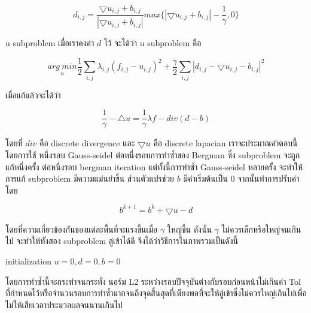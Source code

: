 \documentclass[hidelinks,a4paper,14pt]{article}
\numberwithin{equation}{section}							%
\begin{document}
{		$$ d_{i,j} = \frac{\bigtriangledown u_{i,j}  + b_{i,j} }{ | \bigtriangledown u_{i,j}  + b_{i,j} | } max \{  | \bigtriangledown u_{i,j}  + b_{i,j} | - \frac{1}{\gamma} , 0\} $$
		
		u subproblem เมื่อเราคงค่า $d$ ไว้ จะได้ว่า u subproblem คือ
		
		$$ \underset{u}{arg \ min} \frac{1}{2} \sum_{i,j} \lambda_{i,j}  (f_{i,j} - u_{i,j})^2 + \frac{\gamma}{2} \sum_{i,j} |d_{i,j} - \bigtriangledown u_{i,j} - b_{i,j}|^2$$
		
		เมื่อแก้แล้วจะได้ว่า
		
		$$ \frac{1}{\gamma} - \bigtriangleup u = \frac{1}{\gamma} \lambda f - div (d-b)$$
		
		โดยที่ $div$ คือ discrete divergence และ $\bigtriangledown u$ คือ discrete lapacian เราจะประมาณคำตอบนี้โดยการใช้ หนึ่งรอบ Gauss-seidel ต่อหนึ่งรอบการทำซ้ำของ Bergman ซึ่ง subproblem จะถูกแก้หนึ่งครั้ง ต่อหนึ่งรอบ bergman iteration แต่ทั้งนี้การทำซ้ำ Gauss-seidel หลายครั้ง จะทำให้การแก้ subproblem มีความแม่นยำขึ้น
		ส่วนตัวแปรช่วย $b$ มีค่าเริ่มต้นเป็น 0 จากนั้นทำการปรับค่าโดย
		
		$$ b^{k+1} = b^k  + \bigtriangledown u - d $$
		
		โดยที่ความเกี่ยวข้องกันของแต่ละพื้นที่จะแรงขึ้นเมื่อ $\gamma$ ใหญ่ขึ้น ดังนั้น $\gamma$ ไม่ควรเล็กหรือใหญ่จนเกินไป จะทำให้ทั้งสอง subproblem ลู่เข้าได้ดี
		จึงได้ว่าวิธีการในภาพรวมเป็นดังนี้
		
		
		
		\begin{algorithm}[H]
			\begin{framed}
				initialization $u = 0, d = 0, b = 0$\\
			\end{framed}
		\end{algorithm}
		
		
		
		โดยการทำซ้ำนี้จะกระทำจนกระทั่ง นอร์ม L2 ระหว่างรอบปัจจุบันต่างกับรอบก่อนหน้าไม่เกินค่า Tol ที่กำหนดไว้หรือจำนวนรอบการทำซ้ำมากจนถึงจุดสิ้นสุดที่เพียงพอที่จะให้ลู่เข้าซึ่งไม่ควรใหญ่เกินไปเพื่อไม่ให้เสียเวลาประมวลผลจนนานเกินไป 
	
		
		
}
\end{document}
